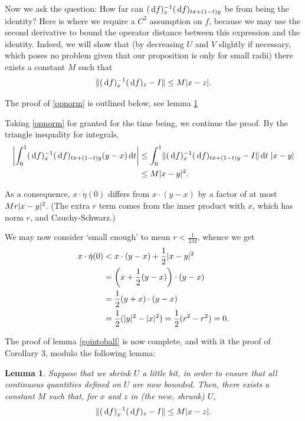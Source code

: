 \documentclass{article}
\newtheorem{lemma}{Lemma}
\theoremstyle{nonumberplain}
\DeclarePairedDelimiter{\norm}{\lvert}{\rvert}
\DeclarePairedDelimiter{\Norm}{\lVert}{\rVert}
\newcommand{\corthree}{Corollary 3}
\begin{document}
Now we ask the question: How far can $(\dl f)_x^{-1} (\dl f)_{tx + (1-t)y}$ be from being the identity? Here is where we require a $C^2$ assumption on $f$, because we may use the second derivative to bound the operator distance between this expression and the identity. Indeed, we will show that (by decreasing $U$ and $V$ slightly if necessary, which poses no problem given that our proposition is only for small radii) there exists a constant $M$ such that
\begin{equation}\label{opnorm}
\Norm{(\dl f)_x^{-1} (\dl f)_{z} - I} \leq M \norm{x-z}.
\end{equation}

The proof of \eqref{opnorm} is outlined below, see lemma \ref{opnormlemma}

Taking \eqref{opnorm} for granted for the time being, we continue the proof. By the triangle inequality for integrals,
\begin{align*}
\norm*{\int_0^1 (\dl f)_x^{-1} (\dl f)_{tx + (1-t)y} (y-x) \dl t} &\leq
\int_0^1 \Norm{(\dl f)_x^{-1} (\dl f)_{tx + (1-t)y} - I} \dl t\; \norm{x-y}\\
&\leq M \norm{x-y}^2.
\end{align*}

As a consequence, $x \cdot \dot\eta(0)$ differs from $x \cdot (y-x)$ by a factor of at most $M r \norm{x-y}^2$. (The extra $r$ term comes from the inner product with $x$, which has norm $r$, and Cauchy-Schwarz.)

We may now consider `small enough' to mean $r < \frac1{2M}$, whence we get
\begin{align*}
x \cdot \dot\eta(0) &< x \cdot (y-x) + \frac12 \norm{x-y}^2\\
&= \left( x + \frac12 (y-x) \right) \cdot (y-x)\\
&= \frac12 (y+x) \cdot (y-x)\\
&= \frac12 (\norm{y}^2 - \norm{x}^2) = \frac12(r^2 - r^2) = 0.
\end{align*}

The proof of lemma \ref{gointoball} is now complete, and with it the proof of \corthree, modulo the following lemma:


\begin{lemma}\label{opnormlemma}
Suppose that we shrink $U$ a little bit, in order to ensure that all continuous quantities defined on $U$ are now bounded. Then, there exists a constant $M$ such that, for $x$ and $z$ in (the new, shrunk) $U$,
\[\Norm{(\dl f)_x^{-1} (\dl f)_{z} - I} \leq M \norm{x-z}.\]
\end{lemma}
\end{document}
